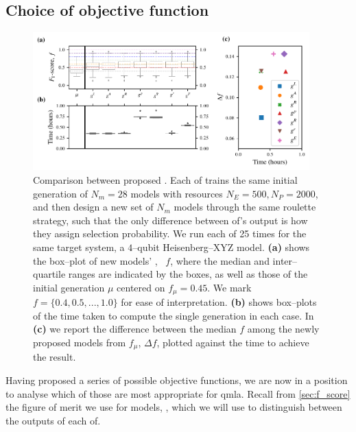 \subsection{Choice of objective function}\label{sec:obj_fnc_selection}
\begin{figure}
    \centering
    \includegraphics[width=0.95\textwidth]{theoretical_study/figures/objective_fnc_comparison.pdf}
    \caption[Comparison between proposed .]{
        Comparison between proposed . 
        Each \gls{of} trains the same initial generation of $N_m=28$ models with resources
        $N_E=500, N_P=2000$, and then design a new set of $N_m$ models through 
        the same roulette strategy, such that the only difference between \gls{of}'s output 
        is how they assign selection probability.
        We run each \gls{of} 25 times for the same target system, 
            a $4$--qubit Heisenberg--XYZ model. 
        \textbf{(a)} shows the box--plot of new models' \fs, \ $f$, 
            where the median and inter--quartile ranges are indicated by the boxes,
            as well as those of the initial generation $\mu$ centered on $f_{\mu}=0.45$.
            We mark $f=\{0.4, 0.5, ..., 1.0\}$ for ease of interpretation. 
        \textbf{(b)} shows box--plots of the time taken to compute the single generation in each case.
        In \textbf{(c)} we report the difference between the median $f$ among the 
            newly proposed models from $f_{\mu}$, $\Delta f$,
            plotted against the time to achieve the result. 
    }
    \label{fig:obj_fnc_comparison}
\end{figure}

Having proposed a series of possible objective functions, 
    we are now in a position to analyse which of those are most appropriate for \gls{qmla}. 
Recall from \cref{sec:f_score} the figure of merit we use for models, \fs, 
    which we will use to distinguish between the outputs of each \gls{of}.
\par 

